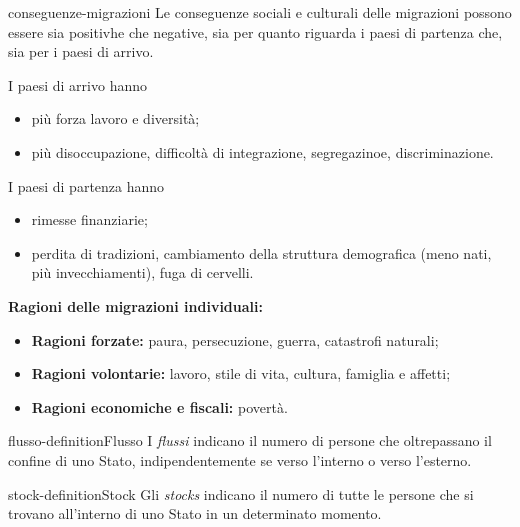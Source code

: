 \documentclass[preview]{standalone}
\begin{document}
\begin{snippet}{conseguenze-migrazioni}
    Le conseguenze sociali e culturali delle migrazioni
    possono essere sia positivhe che negative, sia per quanto
    riguarda i paesi di partenza che, sia per i paesi di arrivo.
    
    I paesi di arrivo hanno
    \begin{itemize}
        \item \greenbox più forza lavoro e diversità;
        \item \redbox più disoccupazione, difficoltà di integrazione,
        segregazinoe, discriminazione.
    \end{itemize}
    
    I paesi di partenza hanno
    \begin{itemize}
        \item \greenbox rimesse finanziarie;
        \item \redbox perdita di tradizioni,
        cambiamento della struttura demografica (meno nati, più invecchiamenti),
        fuga di cervelli.
    \end{itemize}

    \textbf{Ragioni delle migrazioni individuali:}
    \begin{itemize}
        \item \textbf{Ragioni forzate:} paura, persecuzione, guerra, catastrofi naturali;
        \item \textbf{Ragioni volontarie:} lavoro, stile di vita, cultura, famiglia e affetti;
        \item \textbf{Ragioni economiche e fiscali:} povertà.
    \end{itemize}
\end{snippet}

\begin{snippetdefinition}{flusso-definition}{Flusso}
    I \textit{flussi} indicano il numero di persone che oltrepassano il confine di uno
    Stato, indipendentemente se verso l'interno o verso l'esterno.
\end{snippetdefinition}


\begin{snippetdefinition}{stock-definition}{Stock}
    Gli \textit{stocks} indicano il numero di tutte le persone che si trovano all'interno di uno Stato in un
    determinato momento.
\end{snippetdefinition}

\end{document}
